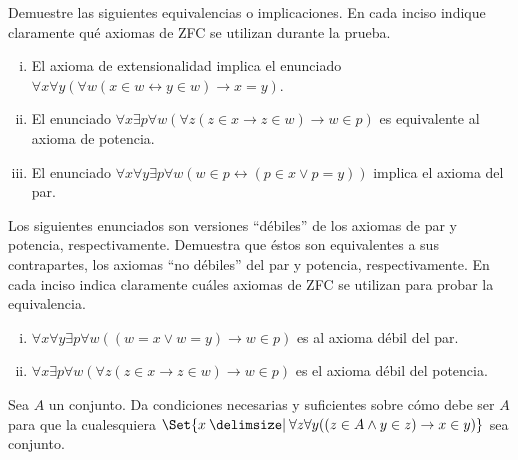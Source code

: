 
\begin{exercise}[tezfc=1]
  Demuestre las siguientes equivalencias o implicaciones. En cada inciso indique claramente qué axiomas de ZFC se utilizan durante la prueba.
   \begin{enumerate}[i)]
       \item El axioma de extensionalidad implica el enunciado \(\forall x \forall y ( \forall w (x \in w \leftrightarrow y \in w) \rightarrow x=y ) \).
       \item El enunciado \(\forall x \exists p \forall w ( \forall z ( z \in x \to z \in w) \rightarrow w \in p )\) es equivalente al axioma de potencia.
       \item El enunciado \( \forall x \forall y \exists p \forall w ( w \in p \leftrightarrow (p \in x \lor p=y ) ) \) implica el axioma del par.
   \end{enumerate}
\end{exercise}

\begin{exercise}
  Los siguientes enunciados son versiones ``débiles'' de los axiomas de par y potencia, respectivamente. Demuestra que éstos son equivalentes a sus contrapartes, los axiomas ``no débiles'' del par y potencia, respectivamente. En cada inciso indica claramente cuáles axiomas de ZFC se utilizan para probar la equivalencia.
  \begin{enumerate}[i)]
      \item \(\forall x \forall y \exists p \forall w ( (w=x \lor w=y) \to w \in p ) \) es al axioma débil del par.
      \item \(\forall x \exists p \forall w ( \forall z ( z \in x \to z \in w) \rightarrow w \in p )\) es el axioma débil del potencia.
  \end{enumerate}
\end{exercise}

\begin{exercise}
  Sea \(A\) un conjunto. Da condiciones necesarias y suficientes sobre cómo debe ser \(A\) para que la cualesquiera \(\Set{x \st \forall z \forall y((z \in A \land y \in z) \to x \in y)}\) sea conjunto.
\end{exercise}

